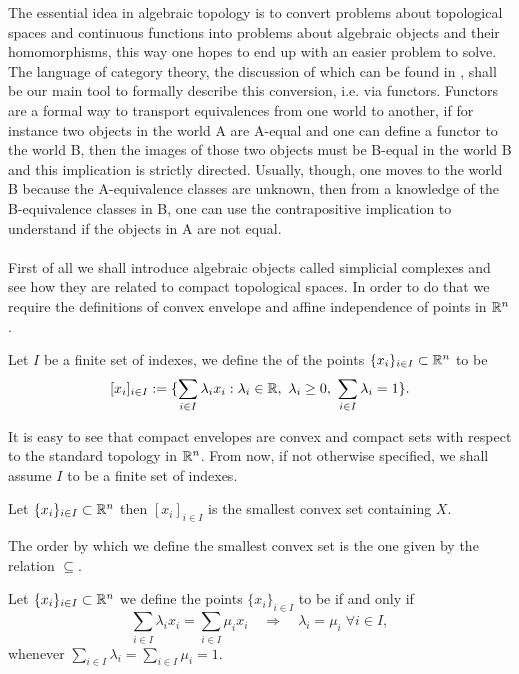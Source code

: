 \documentclass[../1.tex]{subfiles}
\begin{document}
    The essential idea in algebraic topology is to convert problems about topological spaces and continuous functions into
    problems about algebraic objects and their homomorphisms, this way one hopes to end up with an easier problem to solve. 
    The language of category theory, the discussion of which can be found in \cite{rotman}, shall be our main tool to formally
    describe this conversion, i.e. via functors. Functors are a formal way to transport equivalences from one world to another, 
    if for instance two objects in the world A are A-equal and one can define a functor to the world B, then the images of those two objects 
    must be B-equal in the world B and this implication is strictly directed. Usually, though, one moves to the world B because the A-equivalence
    classes are unknown, then from a knowledge of the B-equivalence classes in B, one can use the contrapositive implication 
    to understand if the objects in A are not equal.\\
    \hfill \\
    First of all we shall introduce algebraic objects called simplicial complexes and see how they are related to compact
    topological spaces. In order to do that we require the definitions of convex envelope and affine independence of points in $\mathbb{R}^n$.

    \begin{defn}
        Let $I$ be a finite set of indexes, we define the  of the points $\{x_i\}_{i \in I} \subset \mathbb{R}^n$ to be 
        \[ [ x_i ]_{i \in I} := \{ \sum_{i \in I} \lambda_i x_i : \lambda_i \in \mathbb{R},\ \lambda_i \geq 0,\  \sum_{i \in I} \lambda_i = 1 \}.\]
    \end{defn}

    It is easy to see that compact envelopes are convex and compact sets with respect to the standard topology in $\mathbb{R}^n$.
    From now, if not otherwise specified, we shall assume $I$ to be a finite set of indexes.

    \begin{prop}
        Let $\{x_i\}_{i \in I} \subset \mathbb{R}^n$ then $[ x_i ]_{i \in I}$ is the smallest convex set containing $X$.
    \end{prop}

    The order by which we define the smallest convex set is the one given by the relation $\subseteq$.


    \begin{defn}
        Let $\{x_i\}_{i \in I} \subset \mathbb{R}^n$ we define the points $\{x_i\}_{i \in I}$ to be  if and only if
        \[ \sum_{i \in I} \lambda_i x_i = \sum_{i \in I} \mu_i x_i \quad \Rightarrow \quad 
        \lambda_i = \mu_i \; \forall i \in I ,\]
        whenever $\sum_{i \in I} \lambda_i = \sum_{i \in I} \mu_i = 1$.
    \end{defn}
\end{document}
